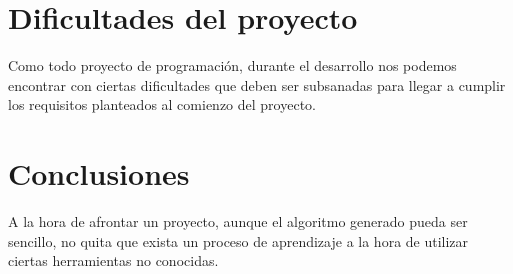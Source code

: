 \documentclass{\ClassPath/viu-tfm-template}
\begin{document}
\chapter{Dificultades del proyecto}

Como todo proyecto de programación, durante el desarrollo nos podemos encontrar con ciertas dificultades que deben ser subsanadas para llegar a cumplir los requisitos planteados al comienzo del proyecto.


\chapter{Conclusiones}

A la hora de afrontar un proyecto, aunque el algoritmo generado pueda ser sencillo, no quita que exista un proceso de aprendizaje a la hora de utilizar ciertas herramientas no conocidas.
\end{document}
